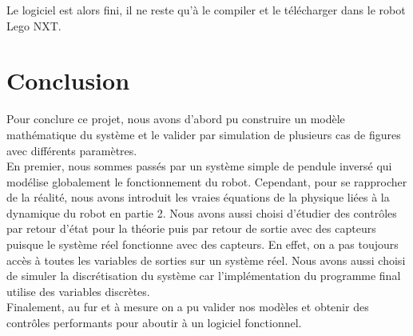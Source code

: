 \documentclass[11pt,french]{article} %
\begin{document}
\quad Le logiciel est alors fini, il ne reste qu'à le compiler et le télécharger dans le robot Lego NXT.


\newpage
\section*{Conclusion}

\quad Pour conclure ce projet, nous avons d'abord pu construire un modèle mathématique du système et le valider par simulation de plusieurs cas de figures avec différents paramètres. \\

\quad En premier, nous sommes passés par un système simple de pendule inversé qui modélise globalement le fonctionnement du robot. Cependant, pour se rapprocher de la réalité, nous avons introduit les vraies équations de la physique liées à la dynamique du robot en partie 2. Nous avons aussi choisi d'étudier des contrôles par retour d'état pour la théorie puis par retour de sortie avec des capteurs puisque le système réel fonctionne avec des capteurs. En effet, on a pas toujours accès à toutes les variables de sorties sur un système réel. Nous avons aussi choisi de simuler la discrétisation du système car l'implémentation du programme final utilise des variables discrètes.\\ 

\quad Finalement, au fur et à mesure on a pu valider nos modèles et obtenir des contrôles performants pour aboutir à un logiciel fonctionnel. 
\end{document}
